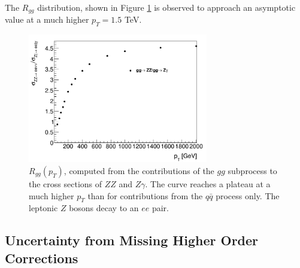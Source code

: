 \documentclass[11pt,a4paper,openright,twoside]{report}
\begin{document}
The $R_{gg}$ distribution, shown in Figure \ref{fig:R_ggonly} is observed to approach an asymptotic value at a much higher $p_T = 1.5$ TeV.

\begin{figure}[h]
\centering
\includegraphics[width=0.7\textwidth]{R_ggonly.png}
\caption{$R_{gg}(p_T)$, computed from the contributions of the $gg$ subprocess to the cross sections of $ZZ$ and $Z\gamma$. The curve reaches a plateau at a much higher $p_T$ than for contributions from the $q\bar{q}$ process only. The leptonic $Z$ bosons decay to an $ee$ pair.}
\label{fig:R_ggonly}
\end{figure}

\subsection{Uncertainty from Missing Higher Order Corrections}
\end{document}
